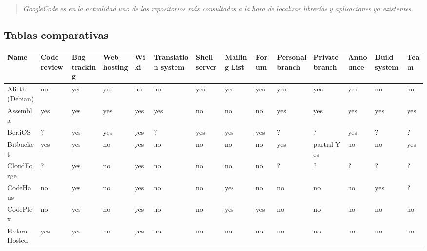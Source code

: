 \begin{quote}
    \emph{GoogleCode es en la actualidad uno de los repositorios más consultados a la hora de localizar librerías y aplicaciones ya existentes.}
\end{quote}


\subsection{Tablas comparativas}
\label{sub:comparativa}

\begin{landscape}

\begin{table}[H]
\centering
\resizebox{1.5\textwidth}{!} {
\begin{tabular}{|l|l|l|l|l|l|l|l|l|l|l|l|l|l|}
    \hline {\bf Name} & {\bf Code review} & {\bf Bug tracking} & {\bf Web hosting} & {\bf Wiki} & {\bf Translation system} & {\bf Shell server} & {\bf Mailing List} & {\bf Forum} & {\bf Personal branch} & {\bf Private branch} & {\bf Announce} & {\bf Build system} & {\bf Team}\\

    \hline Alioth (Debian) & no & yes & yes & no & no & yes & yes & yes & yes & yes & yes & no & no \\

    \hline Assembla & yes & yes & yes & yes & yes & no & no & no & yes & yes & yes & yes & yes\\

    \hline BerliOS & ? & yes & yes & yes & ? & yes & yes & yes & ? & ? & yes & ? & ?\\

    \hline Bitbucket & yes & yes & no & yes & no & no & no & no & yes & partial|Yes & no & no & yes\\

    \hline CloudForge & ? & yes & no & yes & no & no & no & no & ?    & ? & ? & ? & ?\\

    \hline CodeHaus & no & yes & no & yes & no & no & yes & no & no & no & no & yes & ?\\

    \hline CodePlex & no & yes & no & yes & no & no & yes & yes & no & no & no & no & no\\

    \hline Fedora Hosted & yes & yes & no & yes & no & no & no & no & no & no & no & no & no\\


\end{tabular}}
\end{table}
\end{landscape}
